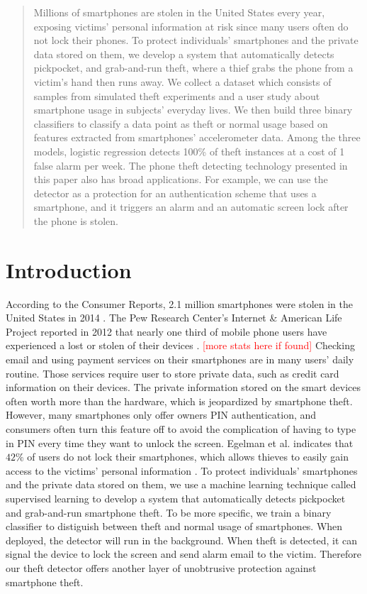 \documentclass{soups}
\begin{document}
\maketitle
\begin{abstract}
Millions of smartphones are stolen in the United States every year, exposing victims' personal information at risk since many users often do not lock their phones. 
To protect individuals' smartphones and the private data stored on them, we develop a system that automatically detects pickpocket, and grab-and-run theft, where a thief grabs the phone from a victim's hand then runs away. 
We collect a dataset which consists of samples from simulated theft experiments and a user study about smartphone usage in subjects' everyday lives. 
We then build three binary classifiers to classify a data point as theft or normal usage based on features extracted from smartphones' accelerometer data. 
Among the three models, logistic regression detects 100\% of theft instances at a cost of 1 false alarm per week. 
The phone theft detecting technology presented in this paper also has broad applications. 
For example, we can use the detector as a protection for an authentication scheme that uses a smartphone, and it triggers an alarm and an automatic screen lock after the phone is stolen.
\end{abstract}




\section{Introduction}
According to the Consumer Reports, 2.1 million smartphones were stolen in the United States in 2014 \cite{deitrick:consumer}. 
The Pew Research Center's Internet \& American Life Project reported in 2012 that nearly one third of mobile phone users have experienced a lost or stolen of their devices \cite{boyles:pew}. \textcolor{red}{[more stats here if found]} 
Checking email and using payment services on their smartphones are in many users' daily routine. 
Those services require user to store private data, such as credit card information on their devices. 
The private information stored on the smart devices often worth more than the hardware, which is jeopardized by smartphone theft. 
However, many smartphones only offer owners PIN authentication, and consumers often turn this feature off to avoid the complication of having to type in PIN every time they want to unlock the screen. 
Egelman et al. indicates that $42\%$ of users do not lock their smartphones, which allows thieves to easily gain access to the victims' personal information \cite{egelman:lock}. 
To protect individuals' smartphones and the private data stored on them, we use a machine learning technique called supervised learning to develop a system that automatically detects pickpocket and grab-and-run smartphone theft. 
To be more specific, we train a binary classifier to distiguish between theft and normal usage of smartphones. 
When deployed, the detector will run in the background. When theft is detected, it can signal the device to lock the screen and send alarm email to the victim. Therefore our theft detector offers another layer of unobtrusive protection against smartphone theft.
\end{document}

